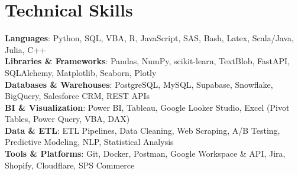 \documentclass[letterpaper,10.5pt]{article}
\begin{document}
\section{Technical Skills}
 \begin{itemize}[leftmargin=0.15in, label={}, topsep=0pt]
    \small{\item{
     \textbf{Languages}{: Python, SQL, VBA, R, JavaScript, SAS, Bash, Latex, Scala/Java, Julia, C++} \\
     \textbf{Libraries \& Frameworks}{: Pandas, NumPy, scikit-learn, TextBlob, FastAPI, SQLAlchemy, Matplotlib, Seaborn, Plotly} \\
     \textbf{Databases \& Warehouses}{: PostgreSQL, MySQL, Supabase, Snowflake, BigQuery, Salesforce CRM, REST APIs} \\
     \textbf{BI \& Visualization}{: Power BI, Tableau, Google Looker Studio, Excel (Pivot Tables, Power Query, VBA, DAX)} \\
     \textbf{Data \& ETL}{: ETL Pipelines, Data Cleaning, Web Scraping, A/B Testing, Predictive Modeling, NLP, Statistical Analysis} \\
     \textbf{Tools \& Platforms}{: Git, Docker, Postman, Google Workspace \& API, Jira, Shopify, Cloudflare, SPS Commerce}
    
    

    }}
 \end{itemize}
\end{document}
